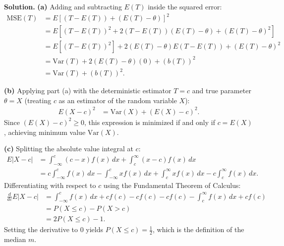 \documentclass[11pt,a4paper]{article}
\begin{document}
\noindent \textbf{Solution.} \textbf{(a)} Adding and subtracting $E(T)$ inside the squared error:
\begin{align*}
\text{MSE}(T) &= E\left[ (T - E(T)) + (E(T) - \theta) \right]^2 \\
&= E\left[ (T - E(T))^2 + 2(T - E(T))(E(T) - \theta) + (E(T) - \theta)^2 \right] \\
&= E\left[ (T - E(T))^2 \right] + 2(E(T) - \theta) E(T - E(T)) + (E(T) - \theta)^2 \\
&= \text{Var}(T) + 2(E(T) - \theta)(0) + (b(T))^2 \\
&= \text{Var}(T) + (b(T))^2.
\end{align*}

\vspace{4pt}
\noindent \textbf{(b)} Applying part (a) with the deterministic estimator $T = c$ and true parameter $\theta = X$ (treating $c$ as an estimator of the random variable $X$):
\begin{align*}
E(X - c)^2 &= \text{Var}(X) + (E(X) - c)^2.
\end{align*}
Since $(E(X) - c)^2 \ge 0$, this expression is minimized if and only if $c = E(X)$, achieving minimum value $\text{Var}(X)$.

\vspace{4pt}
\noindent \textbf{(c)} Splitting the absolute value integral at $c$:
\begin{align*}
E|X - c| &= \int_{-\infty}^{c} (c - x) f(x) \, dx + \int_{c}^{\infty} (x - c) f(x) \, dx \\
&= c \int_{-\infty}^{c} f(x) \, dx - \int_{-\infty}^{c} x f(x) \, dx + \int_{c}^{\infty} x f(x) \, dx - c \int_{c}^{\infty} f(x) \, dx.
\end{align*}
Differentiating with respect to $c$ using the Fundamental Theorem of Calculus:
\begin{align*}
\frac{d}{dc} E|X - c| &= \int_{-\infty}^{c} f(x) \, dx + c f(c) - c f(c) - c f(c) - \int_{c}^{\infty} f(x) \, dx + c f(c) \\
&= P(X \le c) - P(X > c) \\
&= 2 P(X \le c) - 1.
\end{align*}
Setting the derivative to 0 yields $P(X \le c) = \frac{1}{2}$, which is the definition of the median $m$.

\vspace{10pt}
\end{document}
